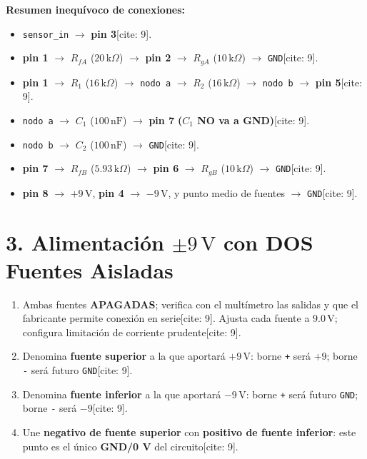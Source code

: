 \documentclass[11pt, a4paper]{article}
\begin{document}
\textbf{Resumen inequívoco de conexiones:}
\begin{itemize}[noitemsep, leftmargin=*]
    \item \texttt{sensor\_in} $\to$ \textbf{pin 3}[cite: 9].
    \item \textbf{pin 1} $\to$ $R_{fA}$ ($20\,\text{k}\Omega$) $\to$ \textbf{pin 2} $\to$ $R_{gA}$ ($10\,\text{k}\Omega$) $\to$ \texttt{GND}[cite: 9].
    \item \textbf{pin 1} $\to$ $R_1$ ($16\,\text{k}\Omega$) $\to$ \texttt{nodo a} $\to$ $R_2$ ($16\,\text{k}\Omega$) $\to$ \texttt{nodo b} $\to$ \textbf{pin 5}[cite: 9].
    \item \texttt{nodo a} $\to$ $C_1$ ($100\,\text{nF}$) $\to$ \textbf{pin 7} \textbf{($C_1$ NO va a GND)}[cite: 9].
    \item \texttt{nodo b} $\to$ $C_2$ ($100\,\text{nF}$) $\to$ \texttt{GND}[cite: 9].
    \item \textbf{pin 7} $\to$ $R_{fB}$ ($5.93\,\text{k}\Omega$) $\to$ \textbf{pin 6} $\to$ $R_{gB}$ ($10\,\text{k}\Omega$) $\to$ \texttt{GND}[cite: 9].
    \item \textbf{pin 8} $\to$ $+9\,\text{V}$, \textbf{pin 4} $\to$ $-9\,\text{V}$, y punto medio de fuentes $\to$ \texttt{GND}[cite: 9].
\end{itemize}

\section{3. Alimentación $\pm 9\,\text{V}$ con DOS Fuentes Aisladas}

\begin{enumerate}[noitemsep, leftmargin=*]
    \item Ambas fuentes \textbf{APAGADAS}; verifica con el multímetro las salidas y que el fabricante permite conexión en serie[cite: 9]. Ajusta cada fuente a $9.0\,\text{V}$; configura limitación de corriente prudente[cite: 9].
    \item Denomina \textbf{fuente superior} a la que aportará $+9\,\text{V}$: borne \texttt{+} será $+9$; borne \texttt{-} será futuro \texttt{GND}[cite: 9].
    \item Denomina \textbf{fuente inferior} a la que aportará $-9\,\text{V}$: borne \texttt{+} será futuro \texttt{GND}; borne \texttt{-} será $-9$[cite: 9].
    \item Une \textbf{negativo de fuente superior} con \textbf{positivo de fuente inferior}: este punto es el único \textbf{GND/0 V} del circuito[cite: 9].
\end{enumerate}
\end{document}
